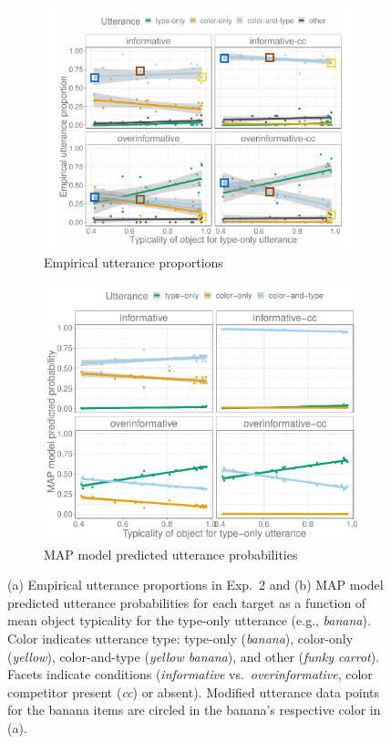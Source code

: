\documentclass[11pt]{article}
\begin{document}
\begin{figure}
\centering
	\begin{subfigure}{.85\textwidth}
		\centering
		\includegraphics[width=.8\textwidth]{pics/empiricalProportions_typ.pdf}
		\caption{Empirical utterance proportions}
		\label{fig:exp2empirical}
	\end{subfigure}
	
	\begin{subfigure}{.85\textwidth}
		\centering
		\includegraphics[width=.77\textwidth]{pics/exp2-none-fixedplusempirical-predictives}
		\caption{MAP model predicted utterance probabilities}
		\label{fig:exp2model}
	\end{subfigure}
\caption{(a) Empirical utterance proportions in Exp.~2 and (b) MAP model predicted utterance probabilities for each target as a function of mean object typicality for the type-only utterance (e.g., \emph{banana}). Color indicates utterance type: type-only (\emph{banana}), color-only (\emph{yellow}), color-and-type (\emph{yellow banana}), and other (\emph{funky carrot}). Facets indicate conditions (\emph{informative} vs.~\emph{overinformative}, color competitor present (\emph{cc}) or absent). Modified utterance data points for the banana items are circled in the banana's respective color in (a).}
\label{fig:exp2results}
\end{figure}
\end{document}
